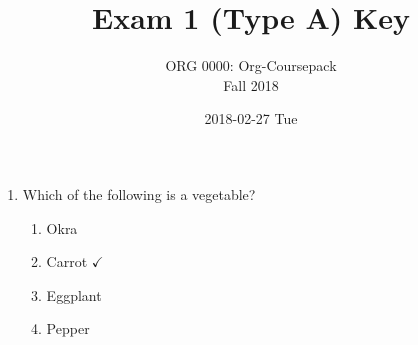 \documentclass[article,letterpaper,times,10pt,listings-bw,microtype]{article}
\author{ORG 0000: Org-Coursepack \\ Fall 2018}
\date{2018-02-27 Tue}
\title{Exam 1 (Type A) Key}
\begin{document}
\maketitle
\begin{enumerate}
\item Which of the following is a vegetable?
\begin{enumerate}
\item Okra
\item Carrot \(\checkmark\)
\item Eggplant
\item Pepper
\end{enumerate}
\end{enumerate}
\end{document}
